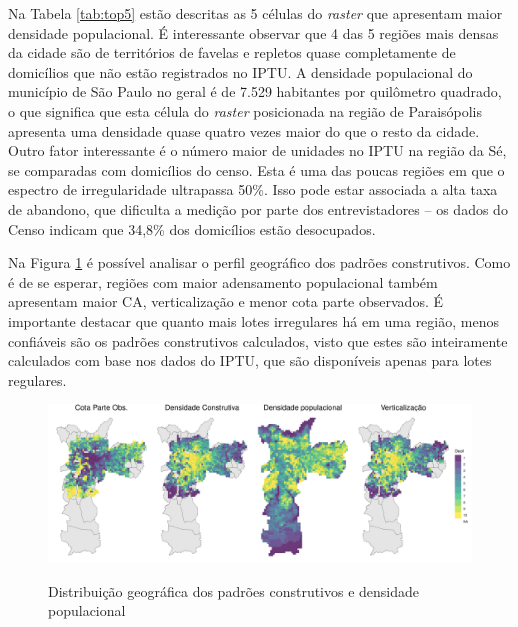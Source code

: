 \begin{table}[h]
    
\end{table}

Na Tabela \ref{tab:top5} estão descritas as 5 células do \textit{raster} que apresentam maior densidade populacional. É interessante observar que 4 das 5 regiões mais densas da cidade são de territórios de favelas e repletos quase completamente de domicílios que não estão registrados no IPTU. A densidade populacional do município de São Paulo no geral é de 7.529 habitantes por quilômetro quadrado, o que significa que esta célula do \textit{raster} posicionada na região de Paraisópolis apresenta uma densidade quase quatro vezes maior do que o resto da cidade. Outro fator interessante é o número maior de unidades no IPTU na região da Sé, se comparadas com domicílios do censo. Esta é uma das poucas regiões em que o espectro de irregularidade ultrapassa 50\%. Isso pode estar associada a alta taxa de abandono, que dificulta a medição por parte dos entrevistadores -- os dados do Censo indicam que 34,8\% dos domicílios estão desocupados.

Na Figura \ref{fig:rasters} é possível analisar o perfil geográfico dos padrões construtivos. Como é de se esperar, regiões com maior adensamento populacional também apresentam maior CA, verticalização e menor cota parte observados. É importante destacar que quanto mais lotes irregulares há em uma região, menos confiáveis são os padrões construtivos calculados, visto que estes são inteiramente calculados com base nos dados do IPTU, que são disponíveis apenas para lotes regulares.

\begin{figure}[h]
    \centering
    \caption{Distribuição geográfica dos padrões construtivos e densidade populacional}
    \includegraphics[width = \linewidth]{imagens/rasters_wide.pdf}
    \label{fig:rasters}
\end{figure}

